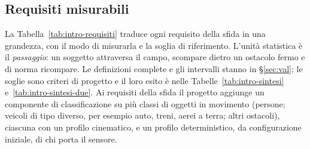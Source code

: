 \subsection{Requisiti misurabili}\label{sec:intro-requisiti}

La Tabella~\ref{tab:intro-requisiti} traduce ogni requisito della sfida in una grandezza, con il modo di misurarla e la soglia di riferimento. L'unità statistica è il \emph{passaggio}: un soggetto attraversa il campo, scompare dietro un ostacolo fermo e di norma ricompare. Le definizioni complete e gli intervalli stanno in \S\ref{sec:val}; le soglie sono criteri di progetto e il loro esito è nelle Tabelle~\ref{tab:intro-sintesi} e~\ref{tab:intro-sintesi-due}. Ai requisiti della sfida il progetto aggiunge un componente di classificazione su più classi di oggetti in movimento (persone; veicoli di tipo diverso, per esempio auto, treni, aerei a terra; altri ostacoli), ciascuna con un profilo cinematico, e un profilo deterministico, da configurazione iniziale, di chi porta il sensore.

